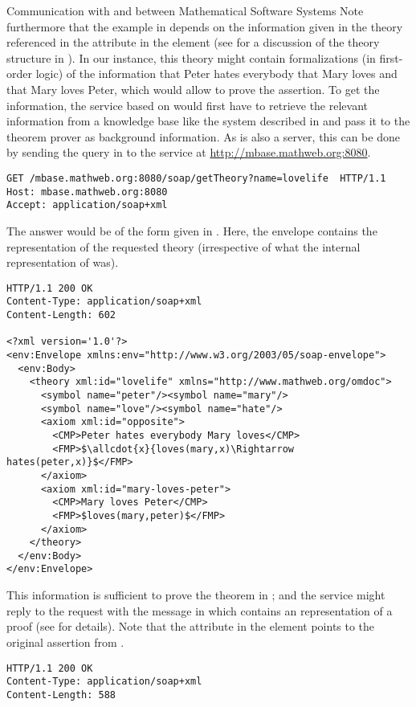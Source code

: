 \begin{tchapter}[id=rpc,short=Communication between Systems]{Communication with and between Mathematical Software Systems}
Note furthermore that the example in {} depends on the information
given in the theory {} referenced in the {}
attribute in the {} element (see {} for a
discussion of the theory structure in {\omdoc}). In our instance, this theory might
contain formalizations (in first-order logic) of the information that Peter hates
everybody that Mary loves and that Mary loves Peter, which would allow {\spass} to prove
the assertion. To get the information, the {\mathwebws} service based on {\spass} would
first have to retrieve the relevant information from a knowledge base like the {\mbase}
system described in {} and pass it to the {\spass} theorem prover as
background information. As {\mbase} is also a {\mathwebws} server, this can be done by
sending the query in {} to the {\mbase} service at
\url{http://mbase.mathweb.org:8080}.

\begin{lstlisting}[label=lst:rpc-getTheory,  
  caption={Requesting a Theory from {\mbase}}]
GET /mbase.mathweb.org:8080/soap/getTheory?name=lovelife  HTTP/1.1
Host: mbase.mathweb.org:8080
Accept: application/soap+xml
\end{lstlisting}
The answer would be of the form given in {}. Here, the
{\soap} envelope contains the {\omdoc} representation of the requested theory
(irrespective of what the internal representation of {\mbase} was).
\begin{lstlisting}[label=lst:rpc-theory,mathescape,
  caption={The Background Theory for Message {\ref{lst:rpc-prover}}}]
HTTP/1.1 200 OK
Content-Type: application/soap+xml
Content-Length: 602

<?xml version='1.0'?>
<env:Envelope xmlns:env="http://www.w3.org/2003/05/soap-envelope">
  <env:Body>
    <theory xml:id="lovelife" xmlns="http://www.mathweb.org/omdoc"> 
      <symbol name="peter"/><symbol name="mary"/> 
      <symbol name="love"/><symbol name="hate"/> 
      <axiom xml:id="opposite"> 
        <CMP>Peter hates everybody Mary loves</CMP> 
        <FMP>$\allcdot{x}{loves(mary,x)\Rightarrow hates(peter,x)}$</FMP> 
      </axiom> 
      <axiom xml:id="mary-loves-peter"> 
        <CMP>Mary loves Peter</CMP> 
        <FMP>$loves(mary,peter)$</FMP>
      </axiom>
    </theory>
  </env:Body>
</env:Envelope>
\end{lstlisting}
This information is sufficient to prove the theorem in {}; and the
{\spass} service might reply to the request with the message in {}
which contains an {\omdoc} representation of a proof (see {} for
details). Note that the {} attribute in the {}
element points to the original assertion from {}.
\begin{lstlisting}[label=lst:rpc-proof,mathescape,
  caption={A proof that Peter hates someone}]
HTTP/1.1 200 OK
Content-Type: application/soap+xml
Content-Length: 588


\end{lstlisting}
\end{tchapter}
